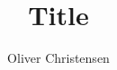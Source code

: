 \documentclass[12pt,a4paper]{article}
\begin{document}
\title{Title}
\author{Oliver Christensen}
\maketitle

\newpage

\tableofcontents
{}
\newpage
\setcounter{page}{1}

\newpage



\newpage
\end{document}
